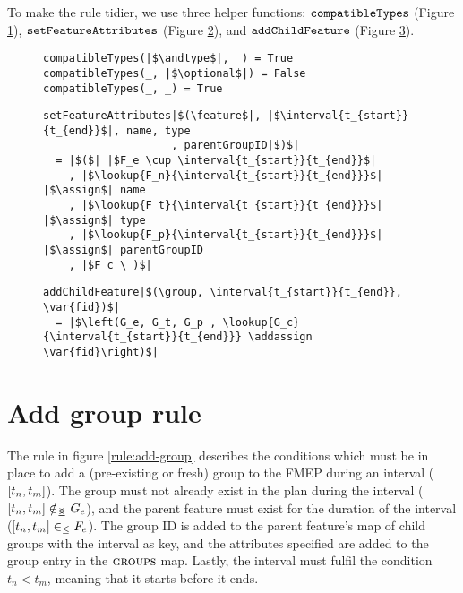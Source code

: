 To make the rule tidier, we use three helper functions: $\texttt{compatibleTypes}$ (Figure \ref{fun:compatible-types}), $\texttt{setFeatureAttributes}$ (Figure \ref{fun:set-feature-attributes}), and $\texttt{addChildFeature}$ (Figure \ref{fun:add-child-feature}). 

\begin{figure}
  \begin{verbatim}
compatibleTypes(|$\andtype$|, _) = True
compatibleTypes(_, |$\optional$|) = False
compatibleTypes(_, _) = True
  \end{verbatim}
  \caption{}
  \label{fun:compatible-types}
\end{figure}

\begin{figure}
  \begin{verbatim}
setFeatureAttributes|$(\feature$|, |$\interval{t_{start}}{t_{end}}$|, name, type
                    , parentGroupID|$)$|
  = |$($| |$F_e \cup \interval{t_{start}}{t_{end}}$|
    , |$\lookup{F_n}{\interval{t_{start}}{t_{end}}}$| |$\assign$| name
    , |$\lookup{F_t}{\interval{t_{start}}{t_{end}}}$| |$\assign$| type
    , |$\lookup{F_p}{\interval{t_{start}}{t_{end}}}$| |$\assign$| parentGroupID
    , |$F_c \ )$|
   \end{verbatim}
  \caption{}
  \label{fun:set-feature-attributes}
\end{figure}

\begin{figure}
  \begin{verbatim}
addChildFeature|$(\group, \interval{t_{start}}{t_{end}}, \var{fid})$|
  = |$\left(G_e, G_t, G_p , \lookup{G_c}{\interval{t_{start}}{t_{end}}} \addassign \var{fid}\right)$|
  \end{verbatim}
  \caption{}
  \label{fun:add-child-feature}
\end{figure}

\section{Add group rule}
\label{sec:add-group-rule}
The rule in figure \ref{rule:add-group} describes the conditions which must be in place to add a (pre-existing or fresh) group to the FMEP during an interval ($\interval{t_n}{t_m}$). The group must not already exist in the plan during the interval ($\interval{t_n}{t_m} \notinnr G_e$), and the parent feature must exist for the duration of the interval ($\interval{t_n}{t_m} \inn F_e$). The group ID is added to the parent feature's map of child groups with the interval as key, and the attributes specified are added to the group entry in the $\textsc{groups}{}$ map. Lastly, the interval must fulfil the condition $t_n < t_m$, meaning that it starts before it ends.

